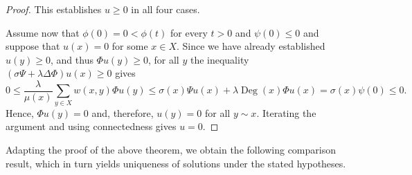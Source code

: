 \documentclass[letterpaper]{article}
\theoremstyle{definition}
\theoremstyle{named}
\numberwithin{equation}{section}
\newcommand{\Deg}{\operatorname{Deg}}
\begin{document}
\begin{proof}
This establishes $u \geq 0$ in all four cases. 

Assume now that $\phi(0)=0<\phi(t)$ for every $t>0$ and  $\psi(0)\leq 0$ and suppose that $u(x)=0$  for some $x \in X$. 
Since we have
already established $u(y) \geq 0$, and thus  $\Phi u(y)\geq 0$, for all $y$ the inequality 
$\left( \sigma\Psi  + \lambda\Delta \Phi\right)u(x) \geq 0$ gives
$$0 \leq \frac{\lambda}{\mu(x)} \sum_{y \in X} w(x,y) \Phi u(y)\leq \sigma(x) \Psi u(x) + \lambda \Deg(x) \Phi u(x) =\sigma(x) \psi(0)
\leq 0.$$
Hence, $\Phi u(y)=0$  and, therefore,  $u(y)=0$ for all $y \sim x$. 
Iterating the argument and using connectedness
gives $u = 0$. 
\end{proof}


{ Adapting the proof of the above theorem, we obtain the following
comparison result, which in turn yields uniqueness of solutions under the stated
hypotheses.}
\end{document}
